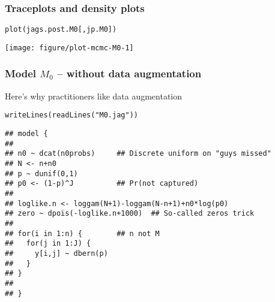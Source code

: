 \documentclass[color=usenames,dvipsnames]{beamer}\usepackage[]{graphicx}\usepackage[]{color}
\makeatletter
\newcommand{\hlstr}[1]{\textcolor[rgb]{0.749,0.012,0.012}{#1}}%
\newcommand{\hlstd}[1]{\textcolor[rgb]{0,0,0}{#1}}%
\newcommand{\hlkwd}[1]{\textcolor[rgb]{0.004,0.004,0.506}{#1}}%
\newenvironment{kframe}{%
 \def\at@end@of@kframe{}%
 \ifinner\ifhmode%
  \def\at@end@of@kframe{\end{minipage}}%
  \begin{minipage}{\columnwidth}%
 \fi\fi%
 \def\FrameCommand##1{\hskip\@totalleftmargin \hskip-\fboxsep
 \colorbox{shadecolor}{##1}\hskip-\fboxsep
     \hskip-\linewidth \hskip-\@totalleftmargin \hskip\columnwidth}%
 \MakeFramed {\advance\hsize-\width
   \@totalleftmargin\z@ \linewidth\hsize
   \@setminipage}}%
 {\par\unskip\endMakeFramed%
 \at@end@of@kframe}
\newenvironment{knitrout}{}{} %
\makeatother
\begin{document}
\begin{frame}[fragile]
  \frametitle{Traceplots and density plots}
\begin{knitrout}\footnotesize
{}\color{fgcolor}\begin{kframe}
\begin{alltt}
\hlkwd{plot}\hlstd{(jags.post.M0[,jp.M0])}
\end{alltt}
\end{kframe}

{\centering \texttt{[image: figure/plot-mcmc-M0-1]} 

}



\end{knitrout}
\end{frame}




\begin{frame}[fragile]
  \frametitle{Model $M_0$ -- without data augmentation}
  Here's why practitioners like data augmentation 
\vspace{-3pt}
\begin{knitrout}\footnotesize
{}\color{fgcolor}\begin{kframe}
\begin{alltt}
\hlkwd{writeLines}\hlstd{(}\hlkwd{readLines}\hlstd{(}\hlstr{"M0.jag"}\hlstd{))}
\end{alltt}
\begin{verbatim}
## model {
## 
## n0 ~ dcat(n0probs)     ## Discrete uniform on "guys missed"
## N <- n+n0           
## p ~ dunif(0,1)
## p0 <- (1-p)^J          ## Pr(not captured)
## 
## loglike.n <- loggam(N+1)-loggam(N-n+1)+n0*log(p0)
## zero ~ dpois(-loglike.n+1000)  ## So-called zeros trick
## 
## for(i in 1:n) {        ## n not M
##   for(j in 1:J) {
##     y[i,j] ~ dbern(p)
##   }
## }
## 
## }
\end{verbatim}
\end{kframe}
\end{knitrout}
\end{frame}
\end{document}
